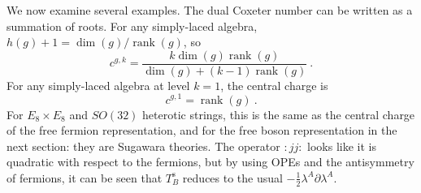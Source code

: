 We now examine several examples. The dual Coxeter number can be written as a summation of roots. For any simply-laced algebra, $h(g)+1=\operatorname{dim}(g)/\operatorname{rank}(g)$, so
\begin{equation}
	c^{g,k} = \frac{k\operatorname{dim}(g)\operatorname{rank}(g)}{\operatorname{dim}(g)+(k-1)\operatorname{rank}(g)}
	\:. \label{11.5.34}
\end{equation}
For any simply-laced algebra at level $k=1$, the central charge is
\begin{equation}
	c^{g,1}=\operatorname{rank}(g) \:. \label{11.5.35}
\end{equation}
For $E_{8}\times E_{8}$ and $SO(32)$ heterotic strings, this is the same as the central charge of the free fermion representation, and for the free boson representation in the next section: they are Sugawara theories. The operator $:jj: $ looks like it is quadratic with respect to the fermions, but by using OPEs and the antisymmetry of fermions, it can be seen that $T_{B}^{\mathrm{s}}$ reduces to the usual $-\tfrac{1}{2}\lambda^{A}\partial\lambda^{A}$.
